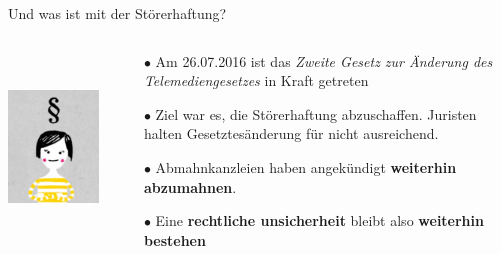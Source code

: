 \documentclass[10pt]{beamer}
\begin{document}
  \begin{frame}{Und was ist mit der Störerhaftung?}
    \begin{columns}[T]
     \begin{column}{4cm}
    	\includegraphics[height=5cm]{images/recht}\\
      \end{column}
      \begin{column}{6cm}
        \begin{itemize}
          \item[\textcolor{freifunkpink}{\Large$\bullet$}] Am 26.07.2016 ist das \textit{Zweite Gesetz zur Änderung des Telemediengesetzes} in Kraft getreten
          \item[\textcolor{freifunkpink}{\Large$\bullet$}] Ziel war es, die Störerhaftung abzuschaffen. Juristen halten Gesetztesänderung für nicht ausreichend.
          \item[\textcolor{freifunkpink}{\Large$\bullet$}] Abmahnkanzleien haben angekündigt \textbf{weiterhin abzumahnen}.
          \item[\textcolor{freifunkpink}{\Large$\bullet$}] Eine \textbf{rechtliche unsicherheit} bleibt also \textbf{weiterhin bestehen} 
        \end{itemize}
      \end{column}
    \end{columns}
  \end{frame}
\end{document}
